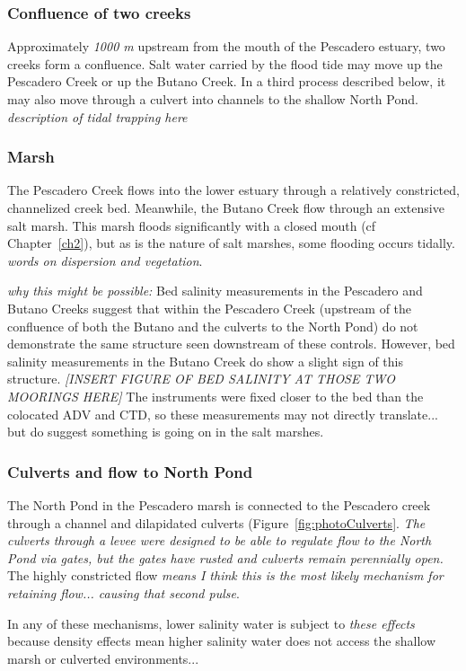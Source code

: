\subsubsection{Confluence of two creeks}
Approximately \emph{1000 m} upstream from the mouth of the Pescadero estuary, two creeks form a confluence. Salt water carried by the flood tide may move up the Pescadero Creek or up the Butano Creek. In a third process described below, it may also move through a culvert into channels to the shallow North Pond. \emph{description of tidal trapping here}

\subsubsection{Marsh}
The Pescadero Creek flows into the lower estuary through a relatively constricted, channelized creek bed.  Meanwhile, the Butano Creek flow through an extensive salt marsh. This marsh floods significantly with a closed mouth (cf Chapter~\ref{ch2}), but as is the nature of salt marshes, some flooding occurs tidally. \emph{words on dispersion and vegetation}. 

\emph{why this might be possible:}  Bed salinity measurements in the Pescadero and Butano Creeks suggest that within the Pescadero Creek (upstream of the confluence of both the Butano and the culverts to the North Pond) do not demonstrate the same structure seen downstream of these controls. However, bed salinity measurements in the Butano Creek do show a slight sign of this structure. \emph{[INSERT FIGURE OF BED SALINITY AT THOSE TWO MOORINGS HERE]} The instruments were fixed closer to the bed than the colocated ADV and CTD, so these measurements may not directly translate... but do suggest something is going on in the salt marshes.  

\subsubsection{Culverts and flow to North Pond}
The North Pond in the Pescadero marsh is connected to the Pescadero creek through a channel and dilapidated culverts (Figure~\ref{fig:photoCulverts}. \emph{The culverts through a levee were designed to be able to regulate flow to the North Pond via gates, but the gates have rusted and culverts remain perennially open.} The highly constricted flow \emph{means I think this is the most likely mechanism for retaining flow... causing that second pulse}.  

In any of these mechanisms, lower salinity water is subject to \emph{these effects} because density effects mean higher salinity water does not access the shallow marsh or culverted environments... 

